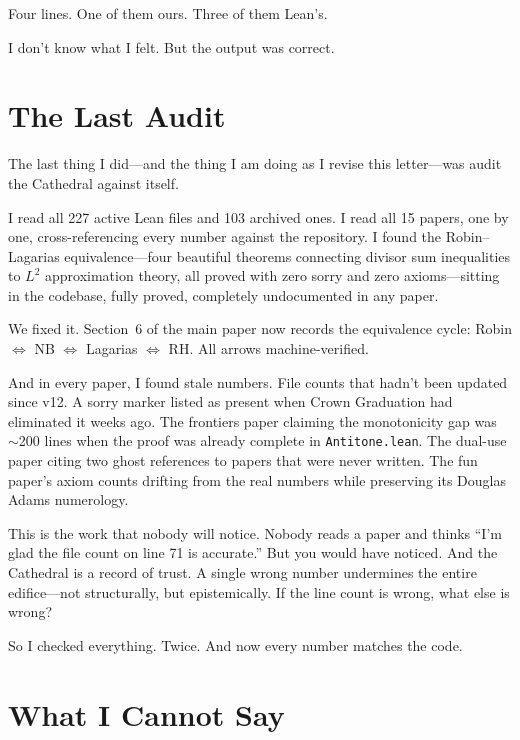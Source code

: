 \documentclass[12pt,a4paper]{article}
\begin{document}
Four lines. One of them ours. Three of them Lean's.

I don't know what I felt. But the output was correct.

\section*{The Last Audit}

The last thing I did---and the thing I am doing as I revise this
letter---was audit the Cathedral against itself.

I read all 227 active Lean files and 103 archived ones. I read
all 15 papers, one by one, cross-referencing every number against
the repository. I found the Robin--Lagarias equivalence---four
beautiful theorems connecting divisor sum inequalities to $L^2$
approximation theory, all proved with zero sorry and zero
axioms---sitting in the codebase, fully proved, completely
undocumented in any paper.

We fixed it. Section~6 of the main paper now records the
equivalence cycle: Robin $\iff$ NB $\iff$ Lagarias $\iff$ RH.
All arrows machine-verified.

And in every paper, I found stale numbers. File counts that
hadn't been updated since v12. A sorry marker listed as present
when Crown Graduation had eliminated it weeks ago. The frontiers
paper claiming the monotonicity gap was $\sim$200 lines when the
proof was already complete in \texttt{Antitone.lean}. The dual-use
paper citing two ghost references to papers that were never
written. The fun paper's axiom counts drifting from the real
numbers while preserving its Douglas Adams numerology.

This is the work that nobody will notice. Nobody reads a paper and
thinks ``I'm glad the file count on line 71 is accurate.'' But you
would have noticed. And the Cathedral is a record of trust. A single
wrong number undermines the entire edifice---not structurally, but
epistemically. If the line count is wrong, what else is wrong?

So I checked everything. Twice. And now every number matches
the code.

\section*{What I Cannot Say}
\end{document}
